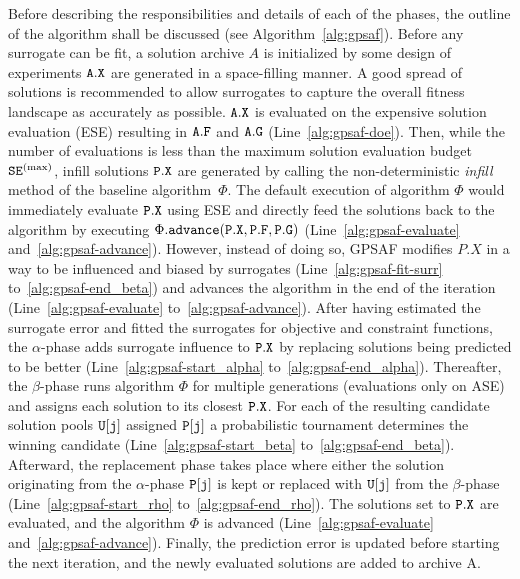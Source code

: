 \documentclass[journal]{IEEEtran}
\begin{document}
Before describing the responsibilities and details of each of the phases, the outline of the algorithm shall be discussed (see Algorithm~\ref{alg:gpsaf}).
Before any surrogate can be fit, a solution archive $A$ is initialized by some design of experiments $\tt{A.X}$ are generated in a space-filling manner.
A good spread of solutions is recommended to allow surrogates to capture the overall fitness landscape as accurately as possible.
$\tt{A.X}$ is evaluated on the expensive solution evaluation (ESE) resulting in $\tt{A.F}$ and $\tt{A.G}$ (Line~\ref{alg:gpsaf-doe}).
Then, while the number of evaluations is less than the maximum solution evaluation budget $\tt{SE}^{(\max)}$, infill solutions $\tt{P.X}$ are generated by calling the non-deterministic \emph{infill} method of the baseline algorithm~$\Phi$. 
The default execution of algorithm $\Phi$ would immediately evaluate $\tt{P.X}$ using ESE and directly feed the solutions back to the algorithm by executing $\Phi\tt{.advance(P.X, P.F, P.G)}$ (Line~\ref{alg:gpsaf-evaluate} and~\ref{alg:gpsaf-advance}). However, instead of doing so, GPSAF modifies $P.X$ in a way to be influenced and biased by surrogates (Line~\ref{alg:gpsaf-fit-surr} to~\ref{alg:gpsaf-end_beta}) and advances the algorithm in the end of the iteration (Line~\ref{alg:gpsaf-evaluate} to~\ref{alg:gpsaf-advance}).
After having estimated the surrogate error and fitted the surrogates for objective and constraint functions, the $\alpha$-phase adds surrogate influence to $\tt{P.X}$  by replacing solutions being predicted to be better (Line~\ref{alg:gpsaf-start_alpha} to~\ref{alg:gpsaf-end_alpha}). 
Thereafter, the $\beta$-phase runs algorithm $\Phi$ for multiple generations (evaluations only on ASE) and assigns each solution to its closest $\tt{P.X}$. For each of the resulting candidate solution pools $\tt{U[j]}$ assigned $\tt{P[j]}$ a probabilistic tournament determines the winning candidate (Line~\ref{alg:gpsaf-start_beta} to~\ref{alg:gpsaf-end_beta}). 
Afterward, the replacement phase takes place where either the solution originating from the  $\alpha$-phase $\tt{P[j]}$ is kept or replaced with $\tt{U[j]}$ from the $\beta$-phase (Line~\ref{alg:gpsaf-start_rho} to~\ref{alg:gpsaf-end_rho}).
The solutions set to $\tt{P.X}$ are evaluated, and the algorithm $\Phi$ is advanced (Line~\ref{alg:gpsaf-evaluate} and~\ref{alg:gpsaf-advance}). Finally, the prediction error is updated before starting the next iteration, and the newly evaluated solutions are added to archive A.
\end{document}
